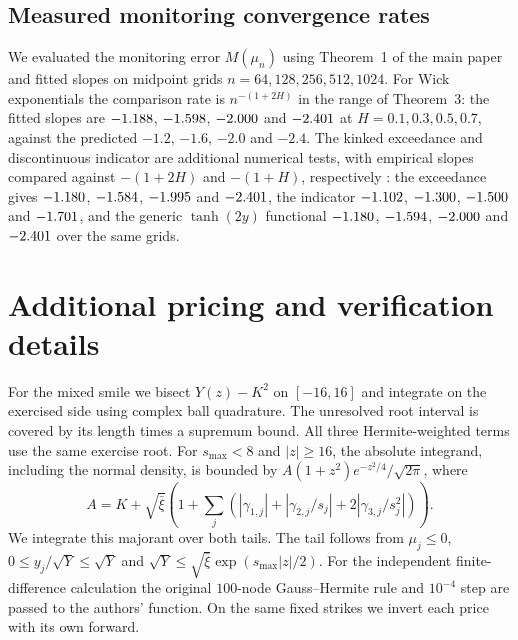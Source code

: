 \documentclass[11pt]{article}
\begin{document}
\subsection{Measured monitoring convergence rates}
We evaluated the monitoring error $M(\mu_n)$ using Theorem~1 of the main paper and fitted slopes on
midpoint grids $n=64,128,256,512,1024$. For Wick exponentials the comparison rate is
$n^{-(1+2H)}$ in the range of Theorem~3: the fitted slopes are $-1.188$, $-1.598$,
$-2.000$ and $-2.401$ at $H=0.1,0.3,0.5,0.7$, against the predicted $-1.2$, $-1.6$, $-2.0$
and $-2.4$. The kinked exceedance and discontinuous indicator are additional numerical tests, with
empirical slopes compared against $-(1+2H)$ and $-(1+H)$, respectively
\citep{Altmeyer2017,NgoOgawa2011}: the exceedance gives $-1.180$, $-1.584$, $-1.995$
and $-2.401$, the indicator $-1.102$, $-1.300$, $-1.500$ and $-1.701$, and the
generic $\tanh(2y)$ functional $-1.180$, $-1.594$, $-2.000$ and $-2.401$ over the
same grids.
\FloatBarrier

\section{Additional pricing and verification details}
For the mixed smile we bisect $Y(z)-K^2$ on $[-16,16]$ and integrate on the exercised
side using complex ball quadrature. The unresolved root interval is covered by its length
times a supremum bound. All three Hermite-weighted terms use the same exercise root.
For $s_{\max}<8$ and $|z|\ge16$, the absolute integrand, including the normal density,
is bounded by $A(1+z^2)e^{-z^2/4}/\sqrt{2\pi}$, where
\[
 A=K+\sqrt{\bar\xi}\left(1+\sum_j
 (|\gamma_{1,j}|+|\gamma_{2,j}/s_j|+2|\gamma_{3,j}/s_j^2|)\right).
\]
We integrate this majorant over both tails. The tail follows from $\mu_j\le0$,
$0\le y_j/\sqrt{Y}\le\sqrt{Y}$ and
$\sqrt{Y}\le\sqrt{\bar\xi}\exp(s_{\max}|z|/2)$. For the independent finite-difference
calculation the original $100$-node Gauss--Hermite rule and $10^{-4}$ step are passed to the authors'
function. On the same fixed strikes we invert each price with its own forward.
\end{document}
